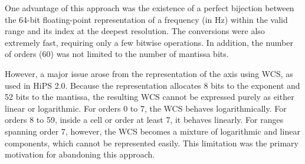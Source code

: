 One advantage of this approach was the existence of a perfect bijection between the
64-bit floating-point representation of a frequency (in Hz) within the valid range and
its index at the deepest resolution. The conversions were also extremely fast, requiring
only a few bitwise operations. In addition, the number of orders (60) was not limited to
the number of mantissa bits.

However, a major issue arose from the representation of the axis using WCS, as used in HiPS 2.0.
Because the representation allocates 8 bits to the exponent and 52 bits to the mantissa,
the resulting WCS cannot be expressed purely as either linear or logarithmic.
For orders 0 to 7, the WCS behaves logarithmically.
For orders 8 to 59, inside a cell or order at least 7, it behaves linearly.
For ranges spanning order 7, however, the WCS becomes a mixture of logarithmic and linear
components, which cannot be represented easily.
This limitation was the primary motivation for abandoning this approach.





